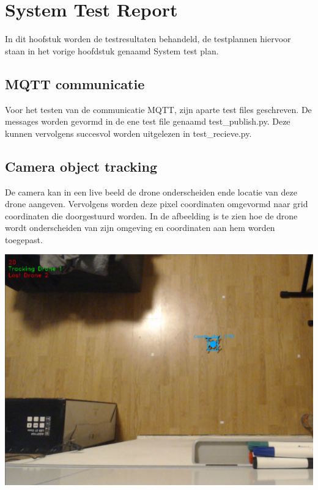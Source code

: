 \section{System Test Report}
In dit hoofstuk worden de testresultaten behandeld, de testplannen hiervoor staan in het vorige hoofdstuk genaamd System test plan.

\subsection{MQTT communicatie}
Voor het testen van de communicatie MQTT, zijn aparte test files geschreven. De messages worden gevormd in de ene test file genaamd test\_publish.py. Deze kunnen vervolgens succesvol worden uitgelezen in test\_recieve.py.

\subsection{Camera object tracking}
De camera kan in een live beeld de drone onderscheiden ende locatie van deze drone aangeven. Vervolgens worden deze pixel coordinaten omgevormd naar grid coordinaten die doorgestuurd worden. In de afbeelding is te zien hoe de drone wordt onderscheiden van zijn omgeving en coordinaten aan hem worden toegepast.
\begin{center}
    \includegraphics[scale=0.5]{../IMAGES/trackedDrone.png}
\end{center}



